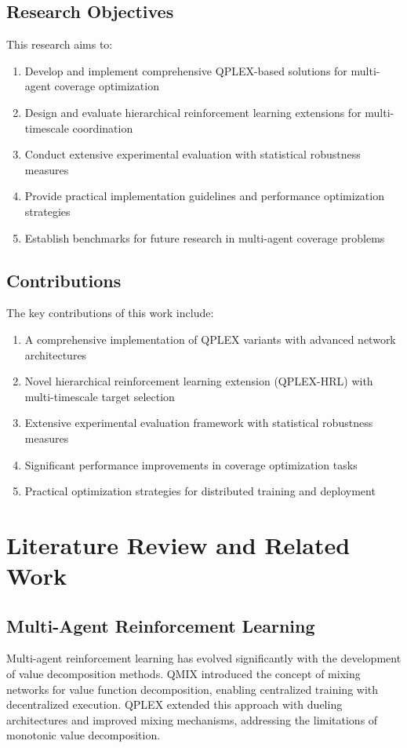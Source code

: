 \documentclass[12pt,a4paper]{report}
\begin{document}
\section{Research Objectives}
This research aims to:
\begin{enumerate}
\item Develop and implement comprehensive QPLEX-based solutions for multi-agent coverage optimization
\item Design and evaluate hierarchical reinforcement learning extensions for multi-timescale coordination
\item Conduct extensive experimental evaluation with statistical robustness measures
\item Provide practical implementation guidelines and performance optimization strategies
\item Establish benchmarks for future research in multi-agent coverage problems
\end{enumerate}

\section{Contributions}
The key contributions of this work include:
\begin{enumerate}
\item A comprehensive implementation of QPLEX variants with advanced network architectures
\item Novel hierarchical reinforcement learning extension (QPLEX-HRL) with multi-timescale target selection
\item Extensive experimental evaluation framework with statistical robustness measures
\item Significant performance improvements in coverage optimization tasks
\item Practical optimization strategies for distributed training and deployment
\end{enumerate}

\chapter{Literature Review and Related Work}

\section{Multi-Agent Reinforcement Learning}
Multi-agent reinforcement learning has evolved significantly with the development of value decomposition methods. QMIX introduced the concept of mixing networks for value function decomposition, enabling centralized training with decentralized execution. QPLEX extended this approach with dueling architectures and improved mixing mechanisms, addressing the limitations of monotonic value decomposition.
\end{document}
